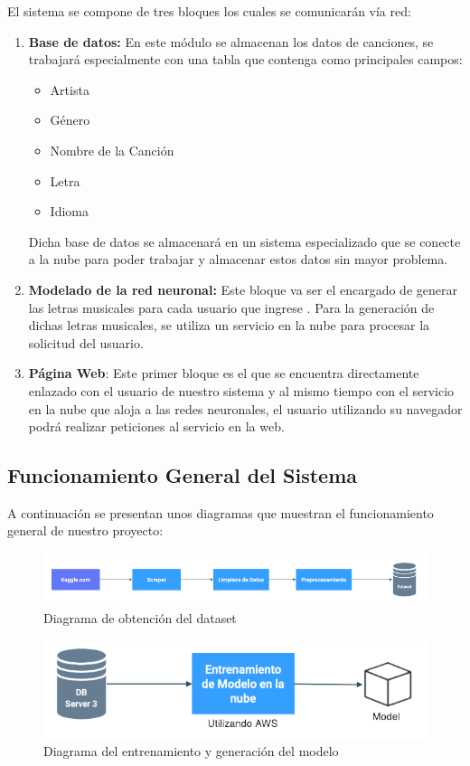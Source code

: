 \documentclass[12pt, a4paper, titlepage]{report}
\begin{document}
		El sistema se compone de tres bloques los cuales se comunicarán vía red:
		\begin{enumerate}
			\item \textbf{Base de datos:} En este módulo se almacenan los datos de canciones, se trabajará especialmente con una tabla que contenga como principales campos:
			\begin{itemize}
				\item Artista
				\item Género
				\item Nombre de la Canción
				\item Letra
				\item Idioma
			\end{itemize}
			Dicha base de datos se almacenará en un sistema especializado que se conecte a la nube para poder trabajar y almacenar estos datos sin mayor problema.
			\item \textbf{Modelado de la red neuronal:} Este bloque va ser el encargado de generar las letras musicales para cada usuario que ingrese . Para la generación de dichas letras musicales, se utiliza un servicio en la nube para procesar la solicitud del usuario. 
			\item \textbf{Página Web}: Este primer bloque es el que se encuentra directamente enlazado con el usuario de nuestro sistema y al mismo tiempo con el servicio en la nube que aloja a las redes neuronales, el usuario utilizando su navegador podrá realizar peticiones al servicio en la web.
		\end{enumerate}
	
		\subsection{Funcionamiento General del Sistema}
		
		A continuación se presentan unos diagramas que muestran el funcionamiento general de nuestro proyecto:
				
		\begin{figure}[H] \caption{Diagrama de obtención del dataset}
			\includegraphics[scale=.5]{./imagenes/Disenio/Arquitectura/DiagramaFuncGen 1.png}
			\centering 
		\end{figure}
	
		\begin{figure}[H] \caption{Diagrama del entrenamiento y generación del modelo}
			\includegraphics[scale=.5]{./imagenes/Disenio/Arquitectura/DiagramaFuncGen 2.png}
			\centering 
		\end{figure}	
	
\end{document}
